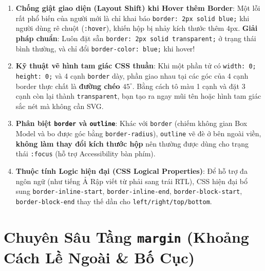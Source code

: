 \documentclass[11pt,oneside]{book}
\newcommand{\codeinline}[1]{\textcolor{accentOrange}{\texttt{#1}}}
\newcommand{\term}[1]{\textbf{\textcolor{primaryBlue}{#1}}}
\DeclareRobustCommand{\csshint}[1]{\texorpdfstring{\textcolor{accentOrange}{\textbf{\texttt{#1}}}}{#1}}
\begin{document}
\begin{conceptBox}
\begin{enumerate}[leftmargin=1.5em, itemsep=3.5pt, parsep=0pt]
    \item \textbf{Chống giật giao diện (\term{Layout Shift}) khi Hover thêm Border}: Một lỗi rất phổ biến của người mới là chỉ khai báo \codeinline{border: 2px solid blue;} khi người dùng rê chuột (\codeinline{:hover}), khiến hộp bị nhảy kích thước thêm $4\text{px}$. \textbf{Giải pháp chuẩn}: Luôn đặt sẵn \codeinline{border: 2px solid transparent;} ở trạng thái bình thường, và chỉ đổi \codeinline{border-color: blue;} khi hover!
    \item \textbf{Kỹ thuật vẽ hình tam giác CSS thuần}: Khi một phần tử có \codeinline{width: 0; height: 0;} và 4 cạnh \codeinline{border} dày, phần giao nhau tại các góc của 4 cạnh border thực chất là \textbf{đường chéo $45^\circ$}. Bằng cách tô màu 1 cạnh và đặt 3 cạnh còn lại thành \codeinline{transparent}, bạn tạo ra ngay mũi tên hoặc hình tam giác sắc nét mà không cần SVG.
    \item \textbf{Phân biệt \codeinline{border} và \codeinline{outline}}: Khác với \codeinline{border} (chiếm không gian Box Model và bo được góc bằng \codeinline{border-radius}), \codeinline{outline} vẽ đè ở bên ngoài viền, \textbf{không làm thay đổi kích thước hộp} nên thường được dùng cho trạng thái \codeinline{:focus} (hỗ trợ Accessibility bàn phím).
    \item \textbf{Thuộc tính Logic hiện đại (\term{CSS Logical Properties})}: Để hỗ trợ đa ngôn ngữ (như tiếng Ả Rập viết từ phải sang trái RTL), CSS hiện đại bổ sung \codeinline{border-inline-start}, \codeinline{border-inline-end}, \codeinline{border-block-start}, \codeinline{border-block-end} thay thế dần cho \codeinline{left/right/top/bottom}.
\end{enumerate}
\end{conceptBox}

\clearpage

\section{Chuyên Sâu Tầng \csshint{margin} (Khoảng Cách Lề Ngoài \& Bố Cục)}
\label{sec:box_model_margin_deep_dive}
\end{document}
